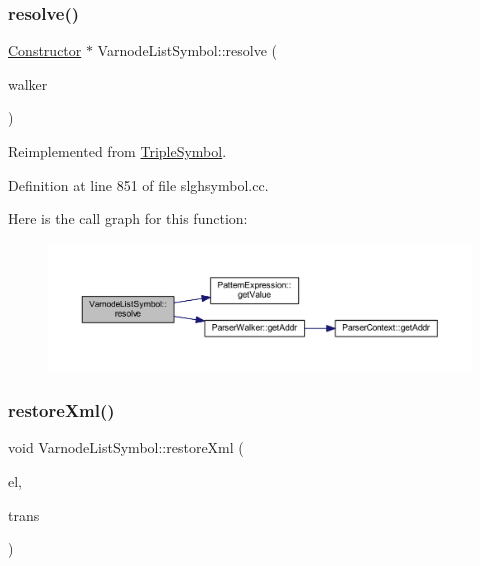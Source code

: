 \subsubsection{\texorpdfstring{resolve()}{resolve()}}
{\footnotesize\ttfamily \mbox{\hyperlink{class_constructor}{Constructor}} $\ast$ Varnode\+List\+Symbol\+::resolve (\begin{DoxyParamCaption}\item[{\mbox{\hyperlink{class_parser_walker}{Parser\+Walker}} \&}]{walker }\end{DoxyParamCaption})\hspace{0.3cm}{\ttfamily [virtual]}}



Reimplemented from \mbox{\hyperlink{class_triple_symbol_adc7ba86d4674c1b3cc8894cfcac33bf1}{Triple\+Symbol}}.



Definition at line 851 of file slghsymbol.\+cc.

Here is the call graph for this function\+:
\nopagebreak
\begin{figure}[H]
\begin{center}
\leavevmode
\includegraphics[width=350pt]{class_varnode_list_symbol_a6757d4ecc0f1844adf14b8370835602a_cgraph}
\end{center}
\end{figure}
\mbox{\label{class_varnode_list_symbol_a61923762838951414bd2c84454652d44}} 
\subsubsection{\texorpdfstring{restoreXml()}{restoreXml()}}
{\footnotesize\ttfamily void Varnode\+List\+Symbol\+::restore\+Xml (\begin{DoxyParamCaption}\item[{const \mbox{\hyperlink{class_element}{Element}} $\ast$}]{el,  }\item[{\mbox{\hyperlink{class_sleigh_base}{Sleigh\+Base}} $\ast$}]{trans }\end{DoxyParamCaption})\hspace{0.3cm}{\ttfamily [virtual]}}



